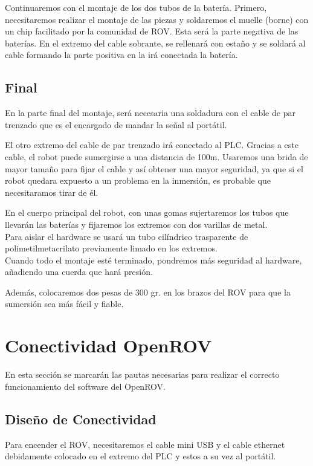 Continuaremos con el montaje de los dos tubos de la batería. Primero, necesitaremos realizar el montaje de las piezas y soldaremos el muelle (borne) con un chip facilitado por la comunidad de ROV. Esta será la parte negativa de las baterías.
En el extremo del cable sobrante, se rellenará con estaño y se soldará al cable formando la parte positiva en la irá conectada la batería.

\subsection{Final}
\label{subsec:final}

En la parte final del montaje, será necesaria una soldadura con el cable de par trenzado que es el encargado de mandar la señal al portátil.

El otro extremo del cable de par trenzado irá conectado al PLC. Gracias a este cable, el robot puede sumergirse a una distancia de 100m. Usaremos una brida de mayor tamaño para fijar el cable y así obtener una mayor seguridad, ya que si el robot quedara expuesto a un problema en la inmersión, es probable que necesitaramos tirar de él.

En el cuerpo principal del robot, con unas gomas sujertaremos los tubos que llevarán las baterías y fijaremos los extremos con dos varillas de metal.
\\Para aislar el hardware se usará un tubo cilíndrico trasparente de polimetilmetacrilato previamente limado en los extremos.
\\Cuando todo el montaje esté terminado, pondremos más seguridad al hardware, añadiendo una cuerda que hará presión.

Además, colocaremos dos pesas de 300 gr. en los brazos del ROV para que la sumersión sea más fácil y fiable.

\section{Conectividad OpenROV}
\label{cap:Conectividad OpenROV}
  
En esta sección se marcarán las pautas necesarias para realizar el correcto funcionamiento del software del OpenROV.  
  
\subsection{Diseño de Conectividad}
\label{subsec:disenio}

Para encender el ROV, necesitaremos el cable mini USB y el cable ethernet debidamente colocado en el extremo del PLC y estos a su vez al portátil.

